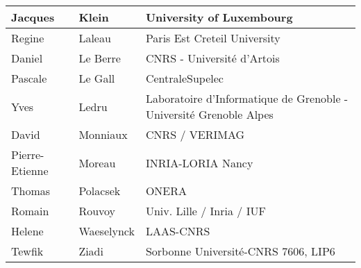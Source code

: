 \begin{table}
\begin{tabular}{|l|l|l|}
Jacques & Klein & University of Luxembourg \\ \hline
Regine & Laleau & Paris Est Creteil University \\ \hline
Daniel & Le Berre & CNRS - Université d'Artois \\ \hline
Pascale & Le Gall & CentraleSupelec \\ \hline
Yves & Ledru & Laboratoire d'Informatique de Grenoble - Université Grenoble Alpes \\ \hline
David & Monniaux & CNRS / VERIMAG \\ \hline
Pierre-Etienne & Moreau & INRIA-LORIA Nancy \\ \hline
Thomas & Polacsek & ONERA \\ \hline
Romain & Rouvoy & Univ. Lille / Inria / IUF \\ \hline
Helene & Waeselynck & LAAS-CNRS \\ \hline
Tewfik & Ziadi & Sorbonne Université-CNRS 7606, LIP6 \\ \hline

\end{tabular}
\end{table}
